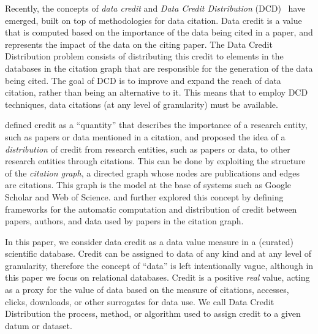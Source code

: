 
Recently, the 
concepts of \emph{data credit} and \emph{Data Credit Distribution} (DCD)~\citep{creditFang18,transitiveCreditKatz2014,zeng2020assigning} have emerged, built on top of methodologies for data citation. 
Data credit is a value that is computed based on the importance of the data being cited in a paper, and represents the impact of the data on the citing paper. 
The Data Credit Distribution problem consists of distributing this credit to elements in the databases in the citation graph that are responsible for the generation of the data being cited. The goal of DCD is to improve and expand the reach of data citation, rather than being an alternative to it. This means that to employ DCD techniques, data citations (at any level of granularity) must be available.

\cite{katz2020SoftwareandData}  defined credit as a ``quantity'' that describes the importance of a research entity, such as papers or data mentioned in a citation, and proposed the idea of a \emph{distribution} of credit from research entities, such as papers or data, to other research entities through citations. 
This can be done by exploiting the structure of the \emph{citation graph}, a directed graph whose nodes are publications and edges are citations.
This graph is the model at the base of systems such as Google Scholar and Web of Science.
\cite{zeng2020assigning} and \cite{creditFang18} further explored this concept by defining frameworks for the automatic computation and distribution of credit between papers, authors, and data used by papers in the citation graph. 

In this paper, we consider data credit as a data value measure in a (curated) scientific database. Credit can be assigned to data of any kind and at any level of granularity, therefore the concept of ``data'' is left intentionally vague, although in this paper we focus on relational databases.
Credit is a positive \emph{real} value, acting as a proxy for the value of data based on the measure of citations, accesses, clicks, downloads, or other surrogates for data use. We call Data Credit Distribution the process, method, or algorithm used to assign credit to a given datum or dataset.

